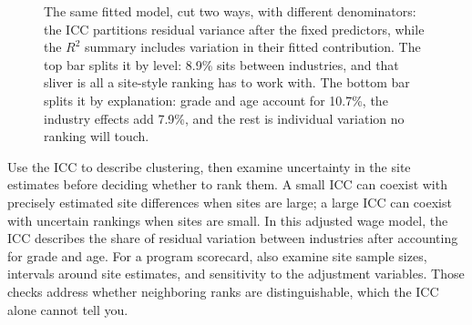 \begin{figure}[htbp]
\centering
{}
\caption[Two reads of the same wage variance]{The same fitted model, cut two ways, with different denominators: the ICC partitions residual variance after the fixed predictors, while the $R^2$ summary includes variation in their fitted contribution. The top bar splits it by level: 8.9\% sits between industries, and that sliver is all a site-style ranking has to work with. The bottom bar splits it by explanation: grade and age account for 10.7\%, the industry effects add 7.9\%, and the rest is individual variation no ranking will touch.}
\label{fig:ch07-viz-varsplit}
\end{figure}

Use the ICC to describe clustering, then examine uncertainty in the site estimates before deciding whether to rank them. A small ICC can coexist with precisely estimated site differences when sites are large; a large ICC can coexist with uncertain rankings when sites are small. In this adjusted wage model, the ICC describes the share of residual variation between industries after accounting for grade and age. For a program scorecard, also examine site sample sizes, intervals around site estimates, and sensitivity to the adjustment variables. Those checks address whether neighboring ranks are distinguishable, which the ICC alone cannot tell you.

